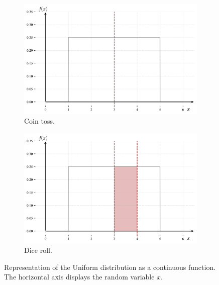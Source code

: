 \documentclass{book}
\begin{document}
\begin{figure}[ht]
    \centering
    \begin{subfigure}[b]{0.48\textwidth}
        \centering
        \includegraphics[width=\textwidth, height=0.7\textwidth]{figures/chapter2/uniform_1.png}
        \caption{Coin toss.}
        \label{fig:uniform1}
    \end{subfigure}
    \hfill
    \begin{subfigure}[b]{0.48\textwidth}
        \centering
        \includegraphics[width=\textwidth, height=0.7\textwidth]{figures/chapter2/uniform_2.png}
        \caption{Dice roll.}
        \label{fig:uniform2}
    \end{subfigure}
    \caption{Representation of the Uniform distribution as a continuous function. The horizontal axis displays the random variable $x$.}
    \label{fig:uniform_comparison}
\end{figure}
\end{document}
